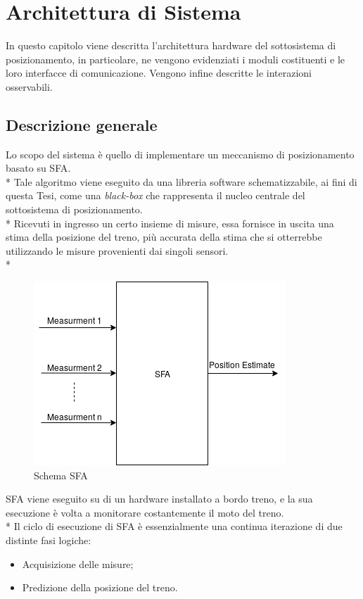 \chapter{Architettura di Sistema}
In questo capitolo viene descritta l'architettura hardware del sottosistema di posizionamento, in particolare, ne vengono evidenziati i moduli costituenti e le loro interfacce di comunicazione. Vengono infine descritte le interazioni osservabili.
\section{Descrizione generale}
Lo scopo del sistema \`e quello di implementare un meccanismo di posizionamento basato su SFA.\\*
Tale algoritmo viene eseguito da una libreria software schematizzabile, ai fini di questa Tesi, come una \emph{black-box} che rappresenta il nucleo centrale del sottosistema di posizionamento.\\*
Ricevuti in ingresso un certo insieme di misure, essa fornisce in uscita una stima della posizione del treno, pi\`u accurata della stima che si otterrebbe utilizzando le misure provenienti dai singoli sensori.\cite{datafuse} \\*
\begin{figure}[h]
	\centering
	\includegraphics[scale=0.6]{img/sfaschema}
	\caption{Schema SFA}
	\label{fig:sfa}
\end{figure}
\clearpage
SFA viene eseguito su di un hardware installato a bordo treno, e la sua esecuzione \`e volta a monitorare costantemente il moto del treno.\\*
Il ciclo di esecuzione di SFA \`e essenzialmente una continua iterazione di due distinte fasi logiche:
\begin{itemize}
	\item Acquisizione delle misure;
	\item Predizione della posizione del treno.
\end{itemize}
